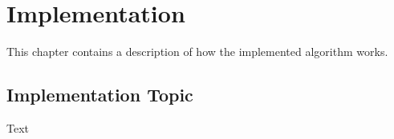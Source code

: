 \documentclass[class=scrbook, crop=false]{standalone}
\begin{document}
\chapter{Implementation} %
\label{Chapter::Implementation}
    This chapter contains a description of how the implemented algorithm works.

\section{Implementation Topic}
\label{Section::Implementation_Topic}
    Text
\end{document}
